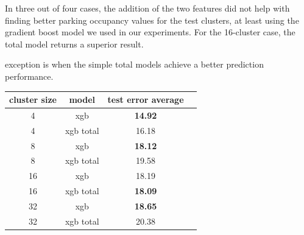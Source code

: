 \documentclass{ws-ijait}
\begin{document}
	In three out of four cases, the addition of the two features did not help with finding better parking occupancy values for the test clusters, at least using the gradient boost model we used in our experiments. For the 16-cluster case, the total model returns a superior result. 
	
	exception is when the simple total models achieve a better prediction performance. 
	
	\begin{table}[!ht]
		{\begin{tabular}{ | c | c | c | c | }
				\hline		
				\textbf{cluster size}  & \textbf{model} & \textbf{test error average} \\ \hline
				4 & {xgb} & \textbf{14.92} \\ \hline
				4 & {xgb total} & 16.18 \\ \hline \hline
				8 & {xgb} & \textbf{18.12} \\ \hline
				8 & {xgb total} & 19.58 \\ \hline \hline
				16 & {xgb} & 18.19 \\ \hline
				16 & {xgb total} & \textbf{18.09} \\ \hline \hline
				32 & {xgb} & \textbf{18.65} \\ \hline
				32 & {xgb total} & 20.38 \\ \hline
		\end{tabular}}
		\label{tab:extended_models_comparison}
	\end{table}
\end{document}
